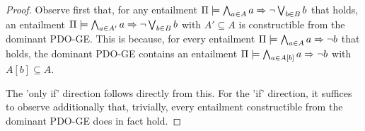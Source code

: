 \begin{proof}
%
Observe first that, for any entailment $\Pi \models \bigwedge_{a
    \in A} a \Rightarrow \neg \bigvee_{b \in B} b$ that holds, an entailment
$\Pi \models \bigwedge_{a \in A'} a \Rightarrow \neg \bigvee_{b \in B} b$
with $A' \subseteq A$ is constructible from the dominant PDO-GE. This
is because, for every entailment $\Pi \models \bigwedge_{a \in A}
  a \Rightarrow \neg b$ that holds, the dominant PDO-GE contains an entailment
$\Pi \models \bigwedge_{a \in A[b]} a \Rightarrow \neg b$ with $A[b]
\subseteq A$.

The 'only if' direction follows directly from this. For the 'if'
direction, it suffices to observe additionally that, trivially, every
entailment constructible from the dominant PDO-GE does in fact hold.
%
%
%
\end{proof}

